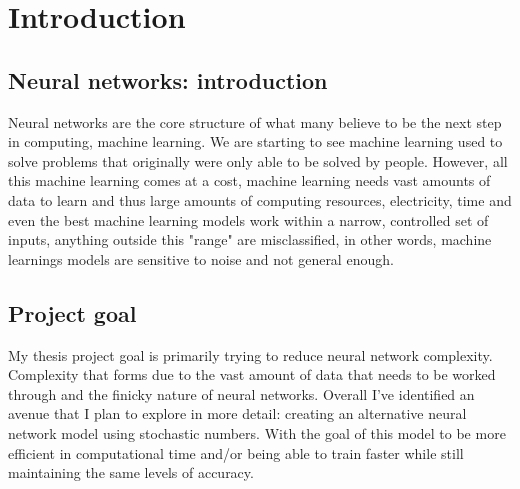 \documentclass[a4paper,oneside,phd,etd]{BYUPhys}
\begin{document}
 \frontmatter


 \makepreliminarypages


\doublespace
%

%

 \clearemptydoublepage
\singlespace
 \tableofcontents

\clearemptydoublepage
\listoffigures

\clearemptydoublepage

\clearemptydoublepage

\mainmatter
%
\chapter{Introduction}
\label{chap:Introduction}


\section{Neural networks: introduction}
Neural networks are the core structure of what many believe to be the next step in computing, machine learning. We are starting to see machine learning used to solve problems that originally were only able to be solved by people. However, all this machine learning comes at a cost, machine learning needs vast amounts of data to learn and thus large amounts of computing resources, electricity, time and even the best machine learning models work within a narrow, controlled set of inputs, anything outside this "range" are misclassified, in other words, machine learnings models are sensitive to noise and not general enough.

\section{Project goal}
My thesis project goal is primarily trying to reduce neural network complexity. Complexity that forms due to the vast amount of data that needs to be worked through and the finicky nature of neural networks. Overall I've identified an avenue that I plan to explore in more detail: creating an alternative neural network model using stochastic numbers. With the goal of this model to be more efficient in computational time and/or being able to train faster while still maintaining the same levels of accuracy.
\end{document}
